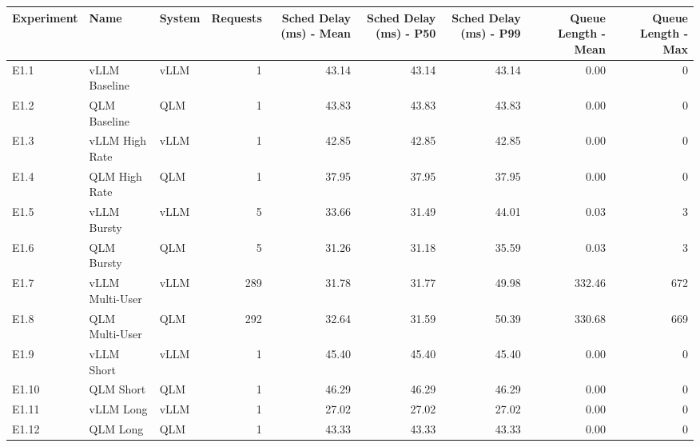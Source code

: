 \begin{tabular}{lllrrrrrr}
\toprule
Experiment & Name & System & Requests & Sched Delay (ms) - Mean & Sched Delay (ms) - P50 & Sched Delay (ms) - P99 & Queue Length - Mean & Queue Length - Max \\
\midrule
E1.1 & vLLM Baseline & vLLM & 1 & 43.14 & 43.14 & 43.14 & 0.00 & 0 \\
E1.2 & QLM Baseline & QLM & 1 & 43.83 & 43.83 & 43.83 & 0.00 & 0 \\
E1.3 & vLLM High Rate & vLLM & 1 & 42.85 & 42.85 & 42.85 & 0.00 & 0 \\
E1.4 & QLM High Rate & QLM & 1 & 37.95 & 37.95 & 37.95 & 0.00 & 0 \\
E1.5 & vLLM Bursty & vLLM & 5 & 33.66 & 31.49 & 44.01 & 0.03 & 3 \\
E1.6 & QLM Bursty & QLM & 5 & 31.26 & 31.18 & 35.59 & 0.03 & 3 \\
E1.7 & vLLM Multi-User & vLLM & 289 & 31.78 & 31.77 & 49.98 & 332.46 & 672 \\
E1.8 & QLM Multi-User & QLM & 292 & 32.64 & 31.59 & 50.39 & 330.68 & 669 \\
E1.9 & vLLM Short & vLLM & 1 & 45.40 & 45.40 & 45.40 & 0.00 & 0 \\
E1.10 & QLM Short & QLM & 1 & 46.29 & 46.29 & 46.29 & 0.00 & 0 \\
E1.11 & vLLM Long & vLLM & 1 & 27.02 & 27.02 & 27.02 & 0.00 & 0 \\
E1.12 & QLM Long & QLM & 1 & 43.33 & 43.33 & 43.33 & 0.00 & 0 \\
\bottomrule
\end{tabular}
